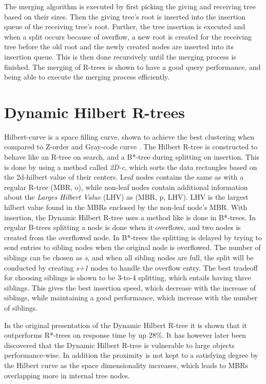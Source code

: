 The merging algorithm is executed by first picking the giving and receiving tree based on their sizes. Then the giving tree's root is inserted into the insertion queue of the receiving tree's root. Further, the tree insertion is executed and when a split occurs because of overflow, a new root is created for the receiving tree before the old root and the newly created nodes are inserted into its insertion queue. This is then done recursively until the merging process is finished. The merging of R-trees is shown to have a good query performance, and being able to execute the merging process efficiently\cite{MergingRtree}.

\section{Dynamic Hilbert R-trees}
Hilbert-curve is a space filling curve, shown to achieve the best clustering when compared to Z-order and Gray-code curve \cite{AnalysisHilbert}. The Hilbert R-tree is constructed to behave like an R-tree on search, and a B*-tree during splitting on insertion. This is done by using a method called \emph{2D-c}, which sorts the data rectangles based on the 2d-hilbert value of their centers. Leaf nodes contains the same as with a regular R-tree (MBR, o), while non-leaf nodes contain additional information about the \emph{Larges Hilbert Value} (LHV) as (MBR, p, LHV). LHV is the largest hilbert value found in the MBRs enclosed by the non-leaf node's MBR. With insertion, the Dynamic Hilbert R-tree uses a method like is done in B*-trees. In regular B-trees splitting a node is done when it overflows, and two nodes is created from the overflowed node. In B*-trees the splitting is delayed by trying to send entries to sibling nodes when the original node is overflowed. The number of siblings can be chosen as \emph{s}, and when all sibling nodes are full, the split will be conducted by creating \emph{s+1} nodes to handle the overflow entry. The best tradeoff for choosing siblings is shown to be 3-to-4 splitting, which entails having three siblings. This gives the best insertion speed, which decrease with the increase of siblings, while maintaining a good performance, which increase with the number of siblings. 

In the original presentation of the Dynamic Hilbert R-tree it is shown that it outperforms R*-trees on response time by up 28\%\cite{HilbertRTree}. It has however later been discovered that the Dynamic Hilbert R-tree is vulnerable to large objects performance-wise. In addition the proximity is not kept to a satisfying degree by the Hilbert curve as the space dimensionality increases, which leads to MBRs overlapping more in internal tree nodes\cite{RTreesTheoryApplications}.

